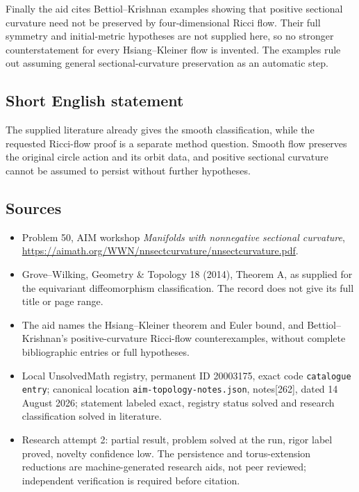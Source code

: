 \documentclass[11pt]{article}
\begin{document}
Finally the aid cites Bettiol--Krishnan examples showing that positive sectional curvature need not be preserved by four-dimensional Ricci flow. Their full symmetry and initial-metric hypotheses are not supplied here, so no stronger counterstatement for every Hsiang--Kleiner flow is invented. The examples rule out assuming general sectional-curvature preservation as an automatic step.
\subsection{Short English statement}
The supplied literature already gives the smooth classification, while the requested Ricci-flow proof is a separate method question. Smooth flow preserves the original circle action and its orbit data, and positive sectional curvature cannot be assumed to persist without further hypotheses.
\subsection{Sources}
\begin{itemize}
\item Problem 50, AIM workshop \emph{Manifolds with nonnegative sectional curvature}, \url{https://aimath.org/WWN/nnsectcurvature/nnsectcurvature.pdf}.
\item Grove--Wilking, Geometry \& Topology 18 (2014), Theorem A, as supplied for the equivariant diffeomorphism classification. The record does not give its full title or page range.
\item The aid names the Hsiang--Kleiner theorem and Euler bound, and Bettiol--Krishnan's positive-curvature Ricci-flow counterexamples, without complete bibliographic entries or full hypotheses.
\item Local UnsolvedMath registry, permanent ID 20003175, exact code \texttt{catalogue entry}; canonical location \texttt{aim-topology-notes.json}, notes[262], dated 14 August 2026; statement labeled exact, registry status solved and research classification solved in literature.
\item Research attempt 2: partial result, problem solved at the run, rigor label proved, novelty confidence low. The persistence and torus-extension reductions are machine-generated research aids, not peer reviewed; independent verification is required before citation.
\end{itemize}
\end{document}
